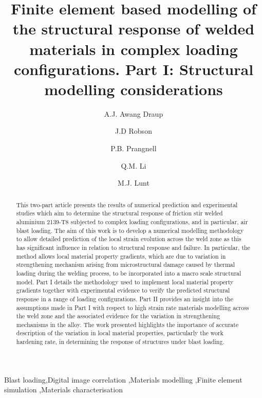 \begin{frontmatter}
\title{Finite element based modelling of the structural response of welded materials in complex loading configurations. %
Part I: Structural modelling considerations}
\author[1]{A.J. Awang Draup }
\author[1]{J.D Robson}
\author[1]{P.B. Prangnell}
\author[1]{Q.M. Li}
\address[1]{The University of Manchester, Manchester, M13 9PL, UK}
\author[2]{M.J. Lunt}
\address[2]{DSTL, Porton, SP4 0JQ, UK}

\begin{abstract}
This two-part article presents the results of numerical  prediction and experimental studies which aim to determine the structural response of friction stir welded aluminium 2139-T8 subjected to complex loading configurations, and in particular, air blast loading. The aim of this work is to develop a numerical modelling methodology to allow detailed prediction of the local strain evolution across the weld zone as this has significant influence in relation to structural response and failure. In particular, the method allows local material property gradients, which are due to variation in strengthening mechanism arising from microstructural damage caused by thermal loading during the welding process, to be incorporated into a macro scale structural model. Part I details the methodology used to implement local material property gradients together with experimental evidence to verify the predicted structural response in a range of loading configurations. Part II provides an insight into the assumptions made in Part I with respect to high strain rate materials modelling across the weld zone and the associated evidence for the variation in strengthening mechanisms in the alloy. The work presented highlights the importance of accurate description of the variation in local material properties, particularly the work hardening rate, in determining the response of structures under blast loading.
\end{abstract}

\begin{keyword}
Blast loading\sep Digital image correlation \sep Materials modelling \sep Finite element simulation \sep Materials characterisation
\end{keyword}

\end{frontmatter}

